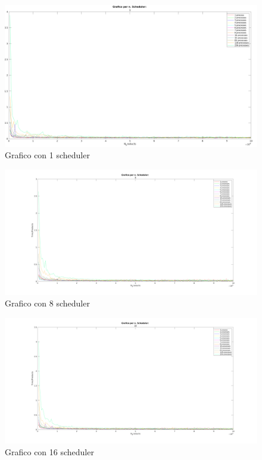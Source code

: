 \begin{figure}[!htp]
    \centering
    \includegraphics[keepaspectratio=true,scale=0.3]{images/matlab/1_scheduler.png}
	\caption{Grafico con 1 scheduler}
  	\label{fig:1_scheduler}
\end{figure}

\begin{figure}[!htp]
    \centering
    \includegraphics[keepaspectratio=true,scale=0.27]{images/matlab/8_scheduler.png}
	\caption{Grafico con 8 scheduler}
  	\label{fig:8_scheduler}
\end{figure}

\begin{figure}[!htp]
    \centering
    \includegraphics[keepaspectratio=true,scale=0.27]{images/matlab/16_scheduler.png}
	\caption{Grafico con 16 scheduler}
  	\label{fig:16_scheduler}
\end{figure}

